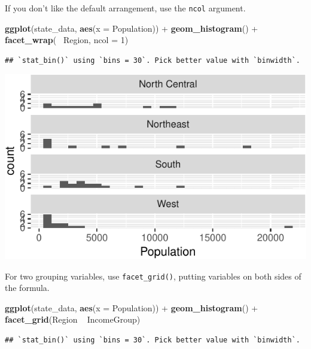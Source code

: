 \documentclass[12pt,oneside,openany]{book}
\newenvironment{Shaded}{\begin{snugshade}}{\end{snugshade}}
\newcommand{\KeywordTok}[1]{\textcolor[rgb]{0.13,0.29,0.53}{\textbf{{#1}}}}
\newcommand{\DataTypeTok}[1]{\textcolor[rgb]{0.13,0.29,0.53}{{#1}}}
\newcommand{\DecValTok}[1]{\textcolor[rgb]{0.00,0.00,0.81}{{#1}}}
\newcommand{\StringTok}[1]{\textcolor[rgb]{0.31,0.60,0.02}{{#1}}}
\newcommand{\NormalTok}[1]{{#1}}
\begin{document}
If you don't like the default arrangement, use the \texttt{ncol}
argument.

\begin{Shaded}
\begin{Highlighting}[]
\KeywordTok{ggplot}\NormalTok{(state_data, }\KeywordTok{aes}\NormalTok{(}\DataTypeTok{x =} \NormalTok{Population)) +}
\StringTok{  }\KeywordTok{geom_histogram}\NormalTok{() +}
\StringTok{  }\KeywordTok{facet_wrap}\NormalTok{(~}\StringTok{ }\NormalTok{Region, }\DataTypeTok{ncol =} \DecValTok{1}\NormalTok{)}
\end{Highlighting}
\end{Shaded}

\begin{verbatim}
## `stat_bin()` using `bins = 30`. Pick better value with `binwidth`.
\end{verbatim}

\includegraphics{pdaps_files/figure-latex/facet-wrap-ncol-1.pdf}

For two grouping variables, use \texttt{facet\_grid()}, putting
variables on both sides of the formula.

\begin{Shaded}
\begin{Highlighting}[]
\KeywordTok{ggplot}\NormalTok{(state_data, }\KeywordTok{aes}\NormalTok{(}\DataTypeTok{x =} \NormalTok{Population)) +}
\StringTok{  }\KeywordTok{geom_histogram}\NormalTok{() +}
\StringTok{  }\KeywordTok{facet_grid}\NormalTok{(Region ~}\StringTok{ }\NormalTok{IncomeGroup)}
\end{Highlighting}
\end{Shaded}

\begin{verbatim}
## `stat_bin()` using `bins = 30`. Pick better value with `binwidth`.
\end{verbatim}
\end{document}
